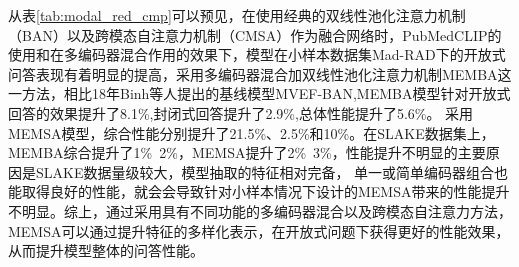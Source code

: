 从表\ref{tab:modal_red_cmp}可以预见，在使用经典的双线性池化注意力机制（BAN）以及跨模态自注意力机制（CMSA）作为融合网络时，PubMedCLIP的使用和在多编码器混合作用的效果下，模型在小样本数据集Mad-RAD下的开放式
问答表现有着明显的提高，采用多编码器混合加双线性池化注意力机制MEMBA这一方法，相比18年Binh等人提出的基线模型MVEF-BAN\cite{nguyen2019overcoming},MEMBA模型针对开放式回答的效果提升了8.1\%,封闭式回答提升了2.9\%,总体性能提升了5.6\%。
采用MEMSA模型，综合性能分别提升了21.5\%、2.5\%和10\%。在SLAKE数据集上，MEMBA综合提升了1\%~2\%，MEMSA提升了2\%~3\%，性能提升不明显的主要原因是SLAKE数据量级较大，模型抽取的特征相对完备，
单一或简单编码器组合也能取得良好的性能，就会会导致针对小样本情况下设计的MEMSA带来的性能提升不明显。综上，通过采用具有不同功能的多编码器混合以及跨模态自注意力方法，MEMSA可以通过提升特征的多样化表示，在开放式问题下获得更好的性能效果，
从而提升模型整体的问答性能。
	
	

